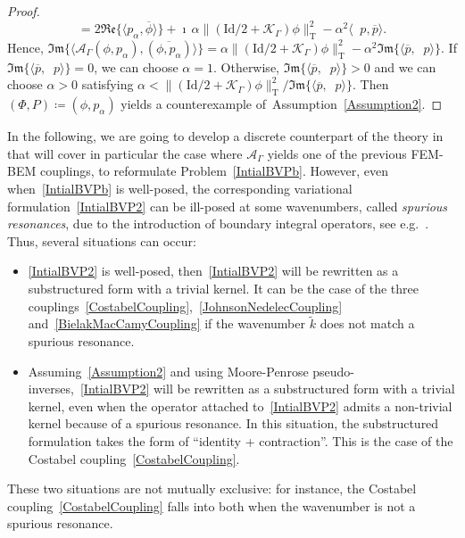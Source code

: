\documentclass[a4paper,11pt]{article}
\newcommand{\Id}{\mathrm{Id}}
\newcommand{\mT}{\mathrm{T}}
\DeclareMathOperator{\V}{\mathcal{V}_{\Gamma}} %
\renewcommand{\Re}{\mathfrak{Re}} %
\renewcommand{\Im}{\mathfrak{Im}} %
\begin{document}
\begin{proof}
\begin{equation*}
      = 2\Re\{\langle p_{\alpha}, \overline{\phi} \rangle\} +
      \imath\, \alpha \lVert (\Id/2 + \mathcal{K}_{\Gamma}) \phi \rVert_{\mT}^2 - \alpha^{2}\langle  \V p,\overline{p} \rangle.
  \end{equation*}
  Hence, \(\Im\{\langle\mathcal{A}_{\Gamma}(\phi,p_{\alpha}),
  (\overline{\phi, p_{\alpha}}) \rangle\} = \alpha \lVert (\Id/2 +
  \mathcal{K}_{\Gamma}) \phi \rVert_{\mT}^2 - \alpha^{2}\Im\{\langle
  \overline{p}, \V p \rangle\}\). If $\Im\{\langle \overline{p}, \V p
  \rangle\} = 0$, we can choose $\alpha = 1$. Otherwise, $\Im\{\langle
  \overline{p}, \V p \rangle\} > 0$ and we can choose
  $\alpha>0$ satisfying $\alpha < \lVert (\Id/2 +
  \mathcal{K}_{\Gamma}) \phi \rVert_{\mT}^2/\Im\{\langle \overline{p},
  \V p \rangle\}$. Then \((\Phi, P) \coloneqq (\phi, p_{\alpha})\)
  yields a counterexample of~Assumption~\eqref{Assumption2}.
\end{proof}

In the following, we are going to develop a discrete counterpart of the
theory in~\cite{MR4665035} that will cover in particular the case where
\(\mathcal{A}_{\Gamma}\) yields one of the previous FEM-BEM couplings, to
reformulate Problem~\eqref{IntialBVPb}. However, even
when~\eqref{IntialBVPb} is well-posed, the corresponding variational
formulation~\eqref{IntialBVP2} can be ill-posed at some wavenumbers, called
\emph{spurious resonances}, due to the introduction of boundary integral
operators, see e.g.~\cite{SchulzHiptmair2022}. Thus, several situations can
occur:
\begin{itemize}
  \item \eqref{IntialBVP2} is well-posed, then~\eqref{IntialBVP2} will be
    rewritten as a substructured form with a trivial kernel. It can be the
    case of the three
    couplings~\eqref{CostabelCoupling},~\eqref{JohnsonNedelecCoupling}
    and~\eqref{BielakMacCamyCoupling} if the wavenumber \(\tilde{k}\) does
    not match a spurious resonance.
  \item Assuming~\eqref{Assumption2} and using Moore-Penrose
    pseudo-inverses,~\eqref{IntialBVP2} will be rewritten as a
    substructured form with a trivial kernel, even when the operator
    attached to~\eqref{IntialBVP2} admits a non-trivial kernel because of a
    spurious resonance. In this situation, the substructured formulation
    takes the form of ``identity + contraction''. This is the case of the
    Costabel coupling~\eqref{CostabelCoupling}.
\end{itemize}
These two situations are not mutually exclusive: for instance, the Costabel coupling~\eqref{CostabelCoupling} falls into both when the wavenumber is not a spurious resonance. 
\end{document}
